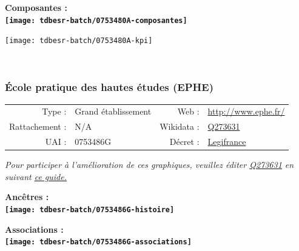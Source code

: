 \documentclass[12pt,french,]{article}
\begin{document}
\hrulefill

\begin{center} \bf Composantes : \\  
\texttt{[image: tdbesr-batch/0753480A-composantes]} \end{center}

\begin{center}\texttt{[image: tdbesr-batch/0753480A-kpi]} \end{center}\checkoddpage

\ifoddpage \fi ~\newpage  

\hypertarget{uxe9cole-pratique-des-hautes-uxe9tudes-ephe}{%
\subsubsection{École pratique des hautes études
(EPHE)}\label{uxe9cole-pratique-des-hautes-uxe9tudes-ephe}}

\begin{tabular*}{\textwidth}{rp{5cm}rl}  
\hline  
Type : & Grand établissement & Web : &\href{http://www.ephe.fr/}{http://www.ephe.fr/} \\  
Rattachement : & N/A & Wikidata : & \href{https://www.wikidata.org/entity/Q273631}{Q273631} \\  
UAI : & 0753486G & Décret : & \href{https://www.legifrance.gouv.fr/affichTexte.do?cidTexte=JORFTEXT000032490129&dateTexte=&categorieLien=id}{Legifrance} \\  
\hline  
\end{tabular*}

\textit{\scriptsize Pour participer à l'amélioration de ces graphiques, veuillez éditer  \href{https://www.wikidata.org/entity/Q273631}{Q273631}  en suivant \href{https://github.com/cpesr/wikidataESR/blob/master/Rmd/wikidataESR.md}{ce guide.}}

\vspace{1cm}  
\begin{minipage}[b]{0.50\textwidth}\begin{center} \bf Ancêtres : \\  
\texttt{[image: tdbesr-batch/0753486G-histoire]} \end{center}\end{minipage}\begin{minipage}[b]{0.50\textwidth}\begin{center} \bf Associations : \\  
\texttt{[image: tdbesr-batch/0753486G-associations]} \end{center}\end{minipage}
\end{document}
